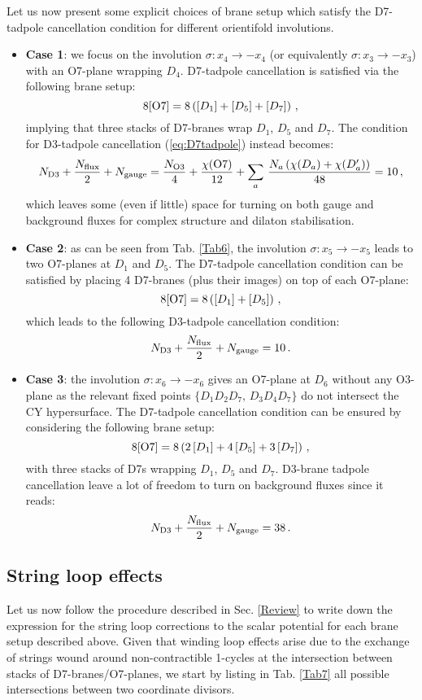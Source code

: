 \documentclass[11pt,a4paper]{article}
\newcommand{\bi}{\begin{itemize}}
\newcommand{\ei}{\end{itemize}}
\newcommand{\be}{\begin{equation}}
\newcommand{\ee}{\end{equation}}
\def\nn{\nonumber}
\begin{document}
Let us now present some explicit choices of brane setup which satisfy the D7-tadpole cancellation condition for different orientifold involutions.
\bi
\item \textbf{Case 1}: we focus on the involution $\sigma: x_4 \to -x_4$ (or equivalently $\sigma: x_3 \to -x_3$) with an O7-plane wrapping $D_4$. D7-tadpole cancellation is satisfied via the following brane setup:
\be
8 [{\rm O7}] = 8 \left( [D_1] + [D_5] + [D_7]\right) \,,
\ee
implying that three stacks of D7-branes wrap $D_1$, $D_5$ and $D_7$. The condition for D3-tadpole cancellation (\ref{eq:D7tadpole}) instead becomes:
\be
N_{\rm D3} + \frac{N_{\rm flux}}{2} + N_{\rm gauge} = \frac{N_{\rm O3}}{4} + \frac{\chi({\rm O7})}{12} + \sum_a\, \frac{N_a \left(\chi(D_a) + \chi(D_a^\prime) \right) }{48} = 10\,, \nn
\ee
which leaves some (even if little) space for turning on both gauge and background fluxes for complex structure and dilaton stabilisation. 

\item \textbf{Case 2}: as can be seen from Tab. \ref{Tab6}, the involution $\sigma: x_5 \to -x_5$ leads to two O7-planes at $D_1$ and $D_5$. The D7-tadpole cancellation condition can be satisfied by placing 4 D7-branes (plus their images) on top of each O7-plane:
\be
8 [{\rm O7}] =  8 \left( [D_1]+ [D_5] \right) \,,
\ee
which leads to the following D3-tadpole cancellation condition:
\be
N_{\rm D3} + \frac{N_{\rm flux}}{2} + N_{\rm gauge} = 10\,. \nn
\ee

\item \textbf{Case 3}: the involution $\sigma: x_6 \to -x_6$ gives an O7-plane at $D_6$ without any O3-plane as the relevant fixed points $\{ {D_1 D_2 D_7}, \, D_3 D_4 D_7 \}$ do not intersect the CY hypersurface. The D7-tadpole cancellation condition can be ensured by considering the following brane setup:
\be
8 [{\rm O7}] = 8 \left(2\, [D_1] + 4\, [D_5] + 3\, [D_7] \right)\,,
\ee
with three stacks of D7s wrapping $D_1$, $D_5$ and $D_7$. D3-brane tadpole cancellation leave a lot of freedom to turn on background fluxes since it reads: 
\be
N_{\rm D3} + \frac{N_{\rm flux}}{2} + N_{\rm gauge} =  38\,. \nn
\ee
\ei

\subsection{String loop effects}

Let us now follow the procedure described in Sec. \ref{Review} to write down the expression for the string loop corrections to the scalar potential for each brane setup described above. Given that winding loop effects arise due to the exchange of strings wound around non-contractible 1-cycles at the intersection between stacks of D7-branes/O7-planes, we start by listing in Tab. \ref{Tab7} all possible intersections between two coordinate divisors. 
\end{document}

